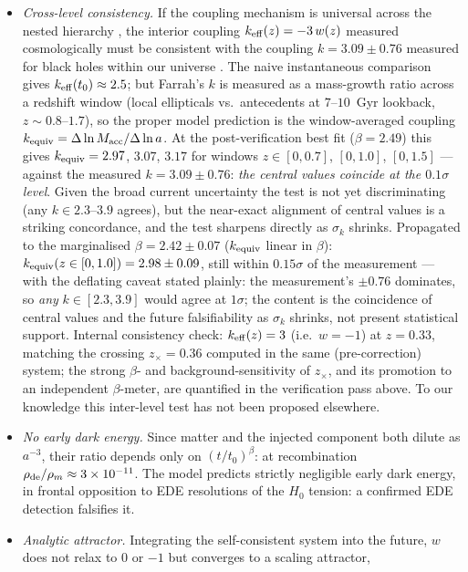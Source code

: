 \documentclass[11pt]{article}
\newcommand{\keff}{k_{\rm eff}}
\begin{document}
\begin{itemize}
\item[P5.] \emph{Cross-level consistency.} If the coupling mechanism is universal across the nested hierarchy \cite{Smolin1997}, the interior coupling $\keff(z) = -3\,w(z)$ measured cosmologically must be consistent with the coupling $k = 3.09 \pm 0.76$ measured for black holes within our universe \cite{Farrah2023}. The naive instantaneous comparison gives $\keff(t_0) \approx 2.5$; but Farrah's $k$ is measured as a mass-growth ratio across a redshift window (local ellipticals vs.\ antecedents at $7$--$10$~Gyr lookback, $z \sim 0.8$--$1.7$), so the proper model prediction is the window-averaged coupling $k_{\rm equiv} = \Delta\ln M_{\rm acc}/\Delta\ln a$. At the post-verification best fit ($\beta = 2.49$) this gives $k_{\rm equiv} = 2.97$, $3.07$, $3.17$ for windows $z \in [0, 0.7]$, $[0, 1.0]$, $[0, 1.5]$ --- against the measured $k = 3.09 \pm 0.76$: \emph{the central values coincide at the $0.1\sigma$ level}. Given the broad current uncertainty the test is not yet discriminating (any $k \in 2.3$--$3.9$ agrees), but the near-exact alignment of central values is a striking concordance, and the test sharpens directly as $\sigma_k$ shrinks. Propagated to the marginalised $\beta = 2.42 \pm 0.07$ ($k_{\rm equiv}$ linear in $\beta$): $k_{\rm equiv}(z\in[0,1.0]) = 2.98 \pm 0.09$, still within $0.15\sigma$ of the measurement --- with the deflating caveat stated plainly: the measurement's $\pm 0.76$ dominates, so \emph{any} $k \in [2.3, 3.9]$ would agree at $1\sigma$; the content is the coincidence of central values and the future falsifiability as $\sigma_k$ shrinks, not present statistical support. Internal consistency check: $\keff(z) = 3$ (i.e.\ $w = -1$) at $z = 0.33$, matching the crossing $z_\times = 0.36$ computed in the same (pre-correction) system; the strong $\beta$- and background-sensitivity of $z_\times$, and its promotion to an independent $\beta$-meter, are quantified in the verification pass above. To our knowledge this inter-level test has not been proposed elsewhere.
\item[P6.] \emph{No early dark energy.} Since matter and the injected component both dilute as $a^{-3}$, their ratio depends only on $(t/t_0)^{\beta}$: at recombination $\rho_{\rm de}/\rho_m \approx 3\times10^{-11}$. The model predicts strictly negligible early dark energy, in frontal opposition to EDE resolutions of the $H_0$ tension: a confirmed EDE detection falsifies it.
\item[P7.] \emph{Analytic attractor.} Integrating the self-consistent system into the future, $w$ does not relax to $0$ or $-1$ but converges to a scaling attractor,

\end{itemize}
\end{document}
